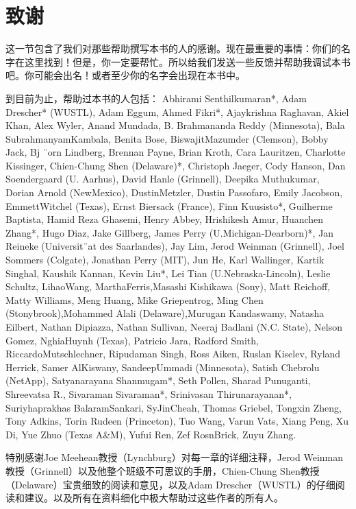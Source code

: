 
\section*{致谢}
这一节包含了我们对那些帮助撰写本书的人的感谢。现在最重要的事情：你们的名字在这里找到！但是，你一定要帮忙。所以给我们发送一些反馈并帮助我调试本书吧。你可能会出名！或者至少你的名字会出现在本书中。

到目前为止，帮助过本书的人包括： Abhirami Senthilkumaran*, Adam Drescher* (WUSTL), Adam Eggum, Ahmed Fikri*, Ajaykrishna Raghavan, Akiel Khan, Alex Wyler, Anand Mundada, B. Brahmananda Reddy (Minnesota), Bala SubrahmanyamKambala, Benita Bose, BiswajitMazumder (Clemson), Bobby Jack, Bj ¨orn Lindberg, Brennan Payne, Brian Kroth, Cara Lauritzen, Charlotte Kissinger, Chien-Chung Shen (Delaware)*, Christoph Jaeger, Cody Hanson, Dan Soendergaard (U. Aarhus), David Hanle (Grinnell), Deepika Muthukumar, Dorian Arnold (NewMexico), DustinMetzler, Dustin Passofaro, Emily Jacobson, EmmettWitchel (Texas), Ernst Biersack (France), Finn Kuusisto*, Guilherme Baptista, Hamid Reza Ghasemi, Henry Abbey, Hrishikesh Amur, Huanchen Zhang*, Hugo Diaz, Jake Gillberg, James Perry (U.Michigan-Dearborn)*, Jan Reineke (Universit¨at des Saarlandes), Jay Lim, Jerod Weinman (Grinnell), Joel Sommers (Colgate), Jonathan Perry (MIT), Jun He, Karl Wallinger, Kartik Singhal, Kaushik Kannan, Kevin Liu*, Lei Tian (U.Nebraska-Lincoln), Leslie Schultz, LihaoWang, MarthaFerris,Masashi Kishikawa (Sony), Matt Reichoff, Matty Williams, Meng Huang, Mike Griepentrog, Ming Chen (Stonybrook),Mohammed Alali (Delaware),Murugan Kandaswamy, Natasha Eilbert, Nathan Dipiazza, Nathan Sullivan, Neeraj Badlani (N.C. State),
Nelson Gomez, NghiaHuynh (Texas), Patricio Jara, Radford Smith, RiccardoMutschlechner, Ripudaman Singh, Ross Aiken, Ruslan Kiselev, Ryland Herrick, Samer AlKiswany, SandeepUmmadi (Minnesota), Satish Chebrolu (NetApp), Satyanarayana Shanmugam*, Seth Pollen, Sharad Punuganti, Shreevatsa R., Sivaraman Sivaraman*, Srinivasan Thirunarayanan*, Suriyhaprakhas BalaramSankari, SyJinCheah, Thomas Griebel, Tongxin Zheng, Tony Adkins, Torin Rudeen (Princeton), Tuo Wang, Varun Vats, Xiang Peng, Xu Di, Yue Zhuo (Texas A\&M), Yufui Ren, Zef RosnBrick, Zuyu Zhang.

特别感谢Joe Meehean教授（Lynchburg）对每一章的详细注释，Jerod Weinman教授（Grinnell）以及他整个班级不可思议的手册，Chien-Chung Shen教授（Delaware）宝贵细致的阅读和意见，以及Adam Drescher（WUSTL）的仔细阅读和建议。以及所有在资料细化中极大帮助过这些作者的所有人。


